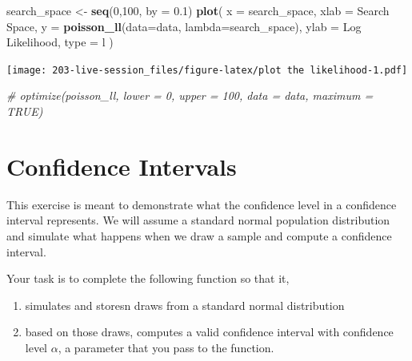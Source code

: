 \documentclass[
]{book}
\newenvironment{Shaded}{\begin{snugshade}}{\end{snugshade}}
\newcommand{\AttributeTok}[1]{\textcolor[rgb]{0.13,0.29,0.53}{#1}}
\newcommand{\CommentTok}[1]{\textcolor[rgb]{0.56,0.35,0.01}{\textit{#1}}}
\newcommand{\DecValTok}[1]{\textcolor[rgb]{0.00,0.00,0.81}{#1}}
\newcommand{\FloatTok}[1]{\textcolor[rgb]{0.00,0.00,0.81}{#1}}
\newcommand{\FunctionTok}[1]{\textcolor[rgb]{0.13,0.29,0.53}{\textbf{#1}}}
\newcommand{\NormalTok}[1]{#1}
\newcommand{\OtherTok}[1]{\textcolor[rgb]{0.56,0.35,0.01}{#1}}
\newcommand{\StringTok}[1]{\textcolor[rgb]{0.31,0.60,0.02}{#1}}
\providecommand{\tightlist}{%
  \setlength{\itemsep}{0pt}\setlength{\parskip}{0pt}}
\theoremstyle{definition}
\theoremstyle{definition}
\theoremstyle{definition}
\theoremstyle{definition}
\theoremstyle{remark}
\begin{document}
\begin{Shaded}
\begin{Highlighting}[]
\NormalTok{search\_space }\OtherTok{\textless{}{-}} \FunctionTok{seq}\NormalTok{(}\DecValTok{0}\NormalTok{,}\DecValTok{100}\NormalTok{, }\AttributeTok{by =} \FloatTok{0.1}\NormalTok{)}
\FunctionTok{plot}\NormalTok{(}
  \AttributeTok{x =}\NormalTok{ search\_space, }\AttributeTok{xlab =} \StringTok{\textquotesingle{}Search Space\textquotesingle{}}\NormalTok{,}
  \AttributeTok{y =} \FunctionTok{poisson\_ll}\NormalTok{(}\AttributeTok{data=}\NormalTok{data, }\AttributeTok{lambda=}\NormalTok{search\_space), }\AttributeTok{ylab =} \StringTok{\textquotesingle{}Log Likelihood\textquotesingle{}}\NormalTok{,}
  \AttributeTok{type =} \StringTok{\textquotesingle{}l\textquotesingle{}}
\NormalTok{)}
\end{Highlighting}
\end{Shaded}

\texttt{[image: 203-live-session\_files/figure-latex/plot the likelihood-1.pdf]}

\begin{Shaded}
\begin{Highlighting}[]
\CommentTok{\# optimize(poisson\_ll, lower = 0, upper = 100, data = data, maximum = TRUE)}
\end{Highlighting}
\end{Shaded}

\hypertarget{confidence-intervals}{%
\section{Confidence Intervals}\label{confidence-intervals}}

This exercise is meant to demonstrate what the confidence level in a confidence interval represents. We will assume a standard normal population distribution and simulate what happens when we draw a sample and compute a confidence interval.

Your task is to complete the following function so that it,

\begin{enumerate}
\def\labelenumi{\arabic{enumi})}
\tightlist
\item
  simulates and stores\texttt{}n draws from a standard normal distribution
\item
  based on those draws, computes a valid confidence interval with confidence level \(\alpha\), a parameter that you pass to the function.
\end{enumerate}
\end{document}

